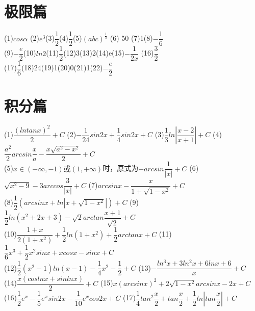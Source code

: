\documentclass[UTF8]{ctexart}
\date{}
\begin{document}
\thispagestyle{fancy}
 \vspace{-8mm} \section{极限篇}
 \noindent (1)$cos\alpha$ \quad\quad\quad(2)$e^3$\quad\quad\quad(3)$\dfrac{1}{2}$\quad\quad\quad(4)$\dfrac{1}{2}$\quad\quad\quad(5)$(abc)^{\frac{1}{3}}$
 \quad\quad\quad(6)-50 \quad\quad\quad(7)1\quad\quad\quad(8)$-\dfrac{1}{6}$
 \\ (9)$-\dfrac{e}{2}$\quad\quad\quad(10)$ln2$\quad\quad\quad(11)$\dfrac{1}{2}$\quad\quad\quad(12)3\quad\quad\quad(13)2\quad\quad\quad(14)e\quad\quad\quad(15)$-\dfrac{1}{2x}$
  \quad\quad\quad(16)$\dfrac{3}{2}$
  \\ (17)$\dfrac{1}{6}$\quad\quad\quad(18)24\quad\quad\quad(19)1\quad\quad\quad(20)0\quad\quad\quad(21)1\quad\quad\quad(22)$-\dfrac{e}{2}$
   \vspace{-8mm} \section{积分篇}
   \noindent (1)$\dfrac{(lntanx)^2}{2}+C$\quad\quad\quad
   (2)$-\dfrac{1}{24}sin2x+\dfrac{1}{4}sin2x+C$\quad\quad\quad
   (3)$\dfrac{1}{3}ln|\dfrac{x-2}{x+1}|+C$\quad\quad\quad
   (4)$\dfrac{a^2}{2}arcsin\dfrac{x}{a}-\dfrac{x\sqrt{a^2-x^2}}{2}+C$\quad\quad\quad
   \\
   (5)$x\in(-\infty,-1)\mbox{或}(1,+\infty)$时，原式为$-arcsin\dfrac{1}{|x|}+C$\quad\quad\quad
   (6)$\sqrt{x^2-9}-3arccos\dfrac{3}{|x|}+C$\quad\quad
   (7)$arcsinx-\dfrac{x}{1+\sqrt{1-x^2}}+C$
   \\
   (8)$\dfrac{1}{2}(arcsinx+ln|x+\sqrt{1-x^2}|)+C$\quad\quad\quad
   (9)$\dfrac{1}{2}ln(x^2+2x+3)-\sqrt{2}arctan\dfrac{x+1}{\sqrt{2}}+C$
   \\
   (10)$\dfrac{1+x}{2(1+x^2)}+\dfrac{1}{2}ln(1+x^2)+\dfrac{1}{2}arctanx+C$\quad\quad\quad
   (11)$\dfrac{1}{6}x^3+\dfrac{1}{2}x^2sinx+xcosx-sinx+C$
   \\
   (12)$\dfrac{1}{2}(x^2-1)ln(x-1)-\dfrac{1}{4}x^2-\dfrac{1}{2}+C$\quad\quad\quad
   (13)$-\dfrac{ln^3x+3ln^2x+6lnx+6}{x}+C$
   \\
   (14)$\dfrac{x(coslnx+sinlnx)}{2}+C$\quad\quad\quad
   (15)$x(arcsinx)^2+2\sqrt{1-x^2}arcsinx-2x+C$
   \\ (16)$\dfrac{1}{2}e^x-\dfrac{1}{5}e^xsin2x-\dfrac{1}{10}e^xcos2x+C$\quad\quad\quad
   (17)$\dfrac{1}{4}tan^2\dfrac{x}{2}+tan\dfrac{x}{2}+\dfrac{1}{2}ln|tan\dfrac{x}{2}|+C$
   \\
\end{document}
